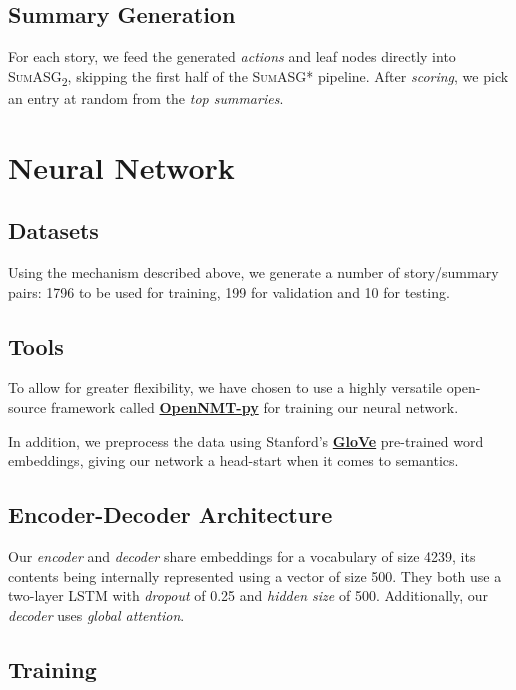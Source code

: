 \subsection{Summary Generation}

For each story, we feed the generated \textit{actions} and leaf nodes directly into \textsc{SumASG\textsubscript{2}}, skipping the first half of the \textsc{SumASG*} pipeline. After \textit{scoring}, we pick an entry at random from the \textit{top summaries}.

\section{Neural Network}

\subsection{Datasets}

Using the mechanism described above, we generate a number of story/summary pairs: 1796 to be used for training, 199 for validation and 10 for testing.

\subsection{Tools}

To allow for greater flexibility, we have chosen to use a highly versatile open-source framework called \textbf{\href{https://github.com/OpenNMT/OpenNMT-py}{OpenNMT-py}} for training our neural network.

In addition, we preprocess the data using Stanford's \textbf{\href{https://nlp.stanford.edu/projects/glove/}{GloVe}} pre-trained word embeddings, giving our network a head-start when it comes to semantics.

\subsection{Encoder-Decoder Architecture}

Our \textit{encoder} and \textit{decoder} share embeddings for a vocabulary of size 4239, its contents being internally represented using a vector of size 500. They both use a two-layer LSTM with \textit{dropout} of 0.25 and \textit{hidden size} of 500. Additionally, our \textit{decoder} uses \textit{global attention}.

\subsection{Training}

